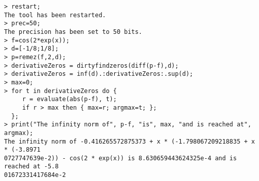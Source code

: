 \begin{center}\begin{minipage}{15cm}\begin{Verbatim}[frame=single]
> restart;
The tool has been restarted.
> prec=50;
The precision has been set to 50 bits.
> f=cos(2*exp(x));
> d=[-1/8;1/8];
> p=remez(f,2,d);
> derivativeZeros = dirtyfindzeros(diff(p-f),d);
> derivativeZeros = inf(d).:derivativeZeros:.sup(d);
> max=0;
> for t in derivativeZeros do {
     r = evaluate(abs(p-f), t);
     if r > max then { max=r; argmax=t; };
  };
> print("The infinity norm of", p-f, "is", max, "and is reached at", argmax);
The infinity norm of -0.416265572875373 + x * (-1.798067209218835 + x * (-3.8971
0727747639e-2)) - cos(2 * exp(x)) is 8.630659443624325e-4 and is reached at -5.8
01672331417684e-2
\end{Verbatim}
\end{minipage}\end{center}
